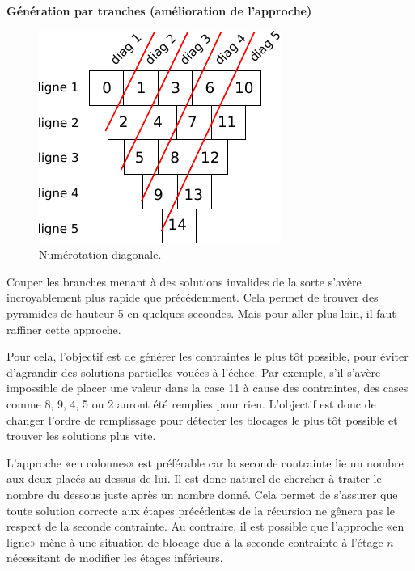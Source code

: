 \documentclass[10pt]{article}\usepackage[nu]{esial}
\begin{document}
\begin{Exercice}\textbf{Génération par tranches (amélioration de l'approche)}
\end{Exercice}

\begin{figure}
  \vspace{-1.6\baselineskip}
  \centerline{\includegraphics[scale=.9]{img/numerotation-diagonales.pdf}}
  \vspace{-.5\baselineskip}
  \caption{Numérotation diagonale.}
  \label{fig:numdiag}
   \vspace{-1.5\baselineskip}
\end{figure}

Couper les branches menant à des solutions invalides de la sorte s'avère
incroyablement plus rapide que précédemment. Cela permet de trouver des
pyramides de hauteur 5 en quelques secondes. Mais pour aller plus loin, il faut
raffiner cette approche.

Pour cela, l'objectif est de générer les contraintes le plus tôt possible, pour
éviter d'agrandir des solutions partielles vouées à l'échec. Par exemple, s'il
s'avère impossible de placer une valeur dans la case 11 à cause des contraintes,
des cases comme 8, 9, 4, 5 ou 2 auront été remplies pour rien. L'objectif est
donc de changer l'ordre de remplissage pour détecter les blocages le plus tôt
possible et trouver les solutions plus vite.

L'approche «en colonnes» est préférable car la seconde contrainte lie un nombre
aux deux placés au dessus de lui. Il est donc naturel de chercher à traiter le
nombre du dessous juste après un nombre donné. Cela permet de s'assurer que
toute solution correcte aux étapes précédentes de la récursion ne gênera pas le
respect de la seconde contrainte. Au contraire, il est possible que l'approche
«en ligne» mène à une situation de blocage due à la seconde contrainte à l'étage
$n$ nécessitant de modifier les étages inférieurs.
\end{document}
